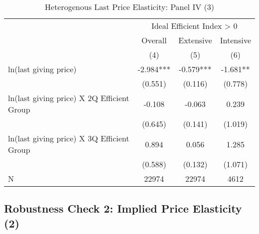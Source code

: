 \documentclass[ review  , 3p ]{elsarticle}
\begin{document}
  \begin{table}
  
  \caption{\label{tab:kableHeteroLastElasticitySlide3}Heterogenous Last Price Elasticity: Panel IV (3)}
  \centering
  \fontsize{8}{10}\selectfont
  \begin{tabular}[t]{lccc}
  \toprule
  \multicolumn{1}{c}{ } & \multicolumn{3}{c}{Ideal Efficient Index > 0} \\
  \cmidrule(l{3pt}r{3pt}){2-4}
  \multicolumn{1}{c}{ } & \multicolumn{1}{c}{Overall} & \multicolumn{1}{c}{Extensive} & \multicolumn{1}{c}{Intensive} \\
  \cmidrule(l{3pt}r{3pt}){2-2} \cmidrule(l{3pt}r{3pt}){3-3} \cmidrule(l{3pt}r{3pt}){4-4}
   & (4) & (5) & (6)\\
  \midrule
  ln(last giving price) & -2.984*** & -0.579*** & -1.681**\\
   & (0.551) & (0.116) & (0.778)\\
  ln(last giving price) X 2Q Efficient Group & -0.108 & -0.063 & 0.239\\
   & (0.645) & (0.141) & (1.019)\\
  ln(last giving price) X 3Q Efficient Group & 0.894 & 0.056 & 1.285\\
   & (0.588) & (0.132) & (1.071)\\
  N & 22974 & 22974 & 4612\\
  \bottomrule
  \end{tabular}
  \end{table}
  
  \hypertarget{robustness-check-2-implied-price-elasticity-2}{%
  \subsection{Robustness Check 2: Implied Price Elasticity (2)}\label{robustness-check-2-implied-price-elasticity-2}}
  
\end{document}
